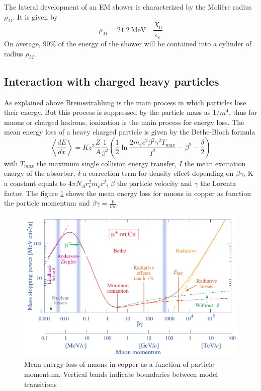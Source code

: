 The lateral development of an EM shower is characterized by the Moli\`ere radius $\rho_{M}$. It is given by \cite{Wigmans:392793}
\begin{equation}
  \rho_{M} = \SI{21.2}{\mega\eV} \quad \frac{X_0}{\epsilon_c}
\end{equation}
On average, 90\% of the energy of the shower will be contained into a cylinder of radius $\rho_{M}$.

\subsection{Interaction with charged heavy particles}

As explained above Bremsstrahlung is the main process in which particles lose their energy. But this process is suppressed by the particle mass as $1/m^4$, thus for muons or charged hadrons, ionization is the main process for energy loss. The mean energy loss of a heavy charged particle is given by the Bethe-Bloch formula \cite{Wigmans:392793}
\begin{equation}
  \left<\frac{dE}{dx}\right> = Kz^2\frac{Z}{A}\frac{1}{\beta^2}\left(\frac{1}{2}\ln\frac{2m_ec^2\beta^2\gamma^2T_{max}}{I^2} - \beta^2 - \frac{\delta}{2}\right)
\end{equation}
with $T_{max}$ the maximum single collision energy transfer, $I$ the mean excitation energy of the absorber, $\delta$ a correction term for density effect depending on $\beta\gamma$, K a constant equals to $4\pi{}N_Ar_e^2m_ec^2$, $\beta$ the particle velocity and $\gamma$ the Lorentz factor. The figure \ref{fig:BetheBloch} shows the mean energy loss for muons in copper as function the particle momentum and $\beta\gamma = \frac{p}{mc}$.

\begin{figure}[htbp!]
  \centering
  \includegraphics[width=0.7\linewidth]{chap2/fig/rpp_icru49_cu_col.pdf}
  \caption{Mean energy loss of muons in copper as a function of particle momentum. Vertical bands indicate boundaries between model transitions \cite{Patrignani:2016xqp}.} \label{fig:BetheBloch}
\end{figure}


